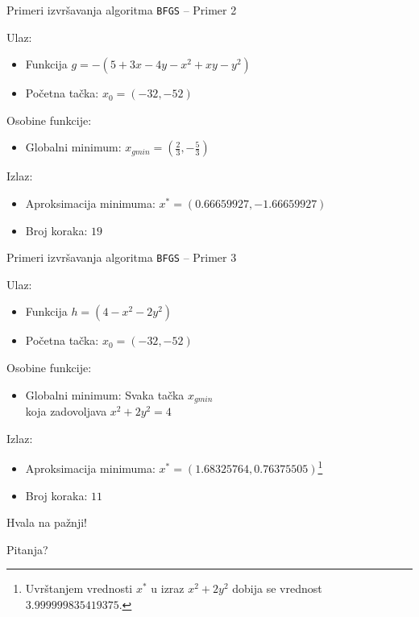 \documentclass[serbian]{beamer}
\begin{document}
\begin{frame}{Primeri izvr\v savanja algoritma \texttt{BFGS} -- Primer 2}

Ulaz:
\begin{itemize}
	\item Funkcija $g = -(5 + 3x - 4y - x^2 + xy - y^2)$
	\item Po\v cetna ta\v cka: $x_0 = (-32, -52)$
\end{itemize}

Osobine funkcije:
\begin{itemize}
	\item Globalni minimum: $x_{gmin} = (\frac{2}{3}, -\frac{5}{3})$
\end{itemize}

Izlaz:
\begin{itemize}
	\item Aproksimacija minimuma: $x^* = (0.66659927, -1.66659927)$
	\item Broj koraka: $19$
\end{itemize}

\end{frame}

\begin{frame}{Primeri izvr\v savanja algoritma \texttt{BFGS} -- Primer 3}

Ulaz:
\begin{itemize}
	\item Funkcija $h = (4 - x^2 - 2y^2)$
	\item Po\v cetna ta\v cka: $x_0 = (-32, -52)$
\end{itemize}

Osobine funkcije:
\begin{itemize}
	\item Globalni minimum: Svaka ta\v cka $x_{gmin}$ \\ 
	koja zadovoljava $x^2 + 2y^2 = 4$
\end{itemize}

Izlaz:
\begin{itemize}
	\item Aproksimacija minimuma: $x^* = (1.68325764, 0.76375505)$\footnote{Uvr\v stanjem vrednosti $x^*$ u izraz $x^2 + 2y^2$ dobija se vrednost $3.999999835419375$.}
	\item Broj koraka: $11$
\end{itemize}

\end{frame}

\begin{frame}

\vspace*{3em}

{\Large Hvala na pa\v znji!} 

\vspace*{1em}

Pitanja?

\end{frame}
\end{document}
